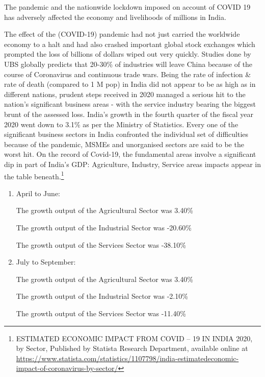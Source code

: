 \begin{multicols}{2}

\noi
The pandemic and the nationwide lockdown imposed on account of COVID 19 has adversely
affected the economy and livelihoods of millions in India.


\noi
The effect of the (COVID-19) pandemic had not just carried the worldwide economy to a halt
and had also crashed important global stock exchanges which prompted the loss of billions of
dollars wiped out very quickly. Studies done by UBS globally predicts that 20-30\% of
industries will leave China because of the course of Coronavirus and continuous trade wars.
Being the rate of infection \& rate of death (compared to 1 M pop) in India did not appear to
be as high as in different nations, prudent steps received in 2020 managed a serious hit to the
nation's significant business areas - with the service industry bearing the biggest brunt of the
assessed loss. India's growth in the fourth quarter of the fiscal year 2020 went down to 3.1\%
as per the Ministry of Statistics. Every one of the significant business sectors in India
confronted the individual set of difficulties because of the pandemic, MSMEs and
unorganised sectors are said to be the worst hit. On the record of Covid-19, the fundamental
areas involve a significant dip in part of India's GDP: Agriculture, Industry, Service areas
impacts appear in the table beneath.\footnote{ESTIMATED ECONOMIC IMPACT FROM COVID – 19 IN INDIA 2020, by Sector, Published by Statista Research Department, available online at  \url{https://www.statista.com/statistics/1107798/india-estimatedeconomic-impact-of-coronavirus-by-sector/}}

\begin{enumerate}[label=$\blacktriangleright$]
\item April to June:

The growth output of the Agricultural Sector was 3.40\%

The growth output of the Industrial Sector was -20.60\%

The growth output of the Services Sector was -38.10\%

\item July to September:

The growth output of the Agricultural Sector was 3.40\%

The growth output of the Industrial Sector was -2.10\%
 
The growth output of the Services Sector was -11.40\% 


\end{enumerate}
\end{multicols}
